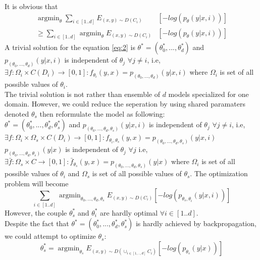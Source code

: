 \documentclass[11pt,a4paper]{article}
\DeclareMathOperator*{\argmin}{argmin}
\begin{document}
It is obvious that
\begin{equation} \label{eq:3}
\begin{split}
\argmin_{\theta} \displaystyle{\mathop{\sum}_{i \in [1..d]}} E_{(x,y) \sim D(C_{i})} &[-log(p_{\theta}(y|x,i))] \\
\geq \displaystyle{\mathop{\sum}_{i \in [1..d]}} \argmin_{\theta} E_{(x,y) \sim D(C_{i})} &[-log(p_{\theta}(y|x,i))]
\end{split}
\end{equation}
A trivial solution for the equation \ref{eq:2} is $\theta^* = (\theta^*_{0},...,\theta^*_{d})$ and $p_{(\theta_{0},...,\theta_d)}(y|x,i)$ is independent of $\theta_{j}$ $\forall j \neq i$, i.e, $\exists f:\Omega_i \times C(D_i) \rightarrow [0,1]: f_{\theta_i}(y,x) = p_{(\theta_{0},...,\theta_d)}(y|x,i)$ where $\Omega_i$ is set of all possible values of $\theta_i$. \\
The trivial solution is not rather than ensemble of $d$ models specialized for one domain. However, we could reduce the seperation by using shared paramaters denoted $\theta_s$ then reformulate the model as following: \\
$\theta^* = (\theta^*_{0},...,\theta^*_{d}, \theta_s^*)$ and $p_{(\theta_{0},...,\theta_d, \theta_s)}(y|x,i)$ is independent of $\theta_{j}$ $\forall j \neq i$, i.e, $\exists f:\Omega_i \times \Omega_s \times C(D_i) \rightarrow [0,1]: f_{\theta_i, \theta_s}(y,x) = p_{(\theta_{0},...,\theta_d, \theta_s)}(y|x,i)$ \\ $p_{(\theta_{0},...,\theta_d, \theta_s)}(y|x)$ is independent of $\theta_{j}$ $\forall j$ i.e, $\exists \bar{f}:\Omega_s \times C \rightarrow [0,1]: \bar{f}_{\theta_s}(y,x) = p_{(\theta_{0},...,\theta_d, \theta_s)}(y|x)$
where $\Omega_i$ is set of all possible values of $\theta_i$ and $\Omega_s$ is set of all possible values of $\theta_s$. The optimization problem will become
\begin{equation}
\displaystyle{\mathop{\sum}_{i \in [1..d]}} \argmin_{\theta_{0},...,\theta_{d}, \theta_s} E_{(x,y) \sim D(C_{i})} [-log(p_{\theta_s,\theta_i}(y|x,i))]
\end{equation}
However, the couple $\theta_s^*$ and $\theta_i^*$ are hardly optimal $\forall i \in [1..d]$.\\
Despite the fact that $\theta^* = (\theta^*_{0},...,\theta^*_{d}, \theta_s^*)$ is hardly achieved by backpropagation, we could attempt to optimize $\theta_s$:
\begin{equation}
\theta^*_{s} = \displaystyle{\mathop{\argmin}_{\theta_s}}E_{(x,y) \sim D(\displaystyle{\mathop{\cup}_{i \in [1,..,d]}}C_{i})}[-log(p_{\theta_s}(y|x))]
\end{equation} 
\end{document}

